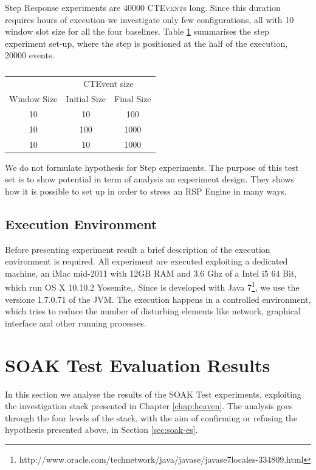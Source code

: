 Step Response experiments are 40000 \textsc{CTEvent}s long. Since this duration requires hours of execution we investigate only few configurations, all with 10 window slot size for all the four baselines. Table \ref{tab:steptests} summarises the step experiment set-up, where the step is positioned at the half of the execution, 20000 events.
\begin{table}[htb]
\centering
 \begin{tabular}{c|c|c}
	  	\hline
	  	&\multicolumn{2}{c}{CTEvent size}  \\
		Window Size & Initial Size & Final Size\\
		\hline
		\hline
		 10 & 10 & 100\\
		  10 & 100 & 1000\\
		 10 & 10 & 1000\\
		\hline 
 \end{tabular}
 \caption{}
\label{tab:steptests}
\end{table}

We do not formulate hypothesis for Step experiments. The purpose of this test set is to show \name potential in term of analysis an experiment design. They shows how it is possible to set up \name in order to stress an RSP Engine in many ways.

\subsection{Execution Environment}\label{sec:execution-environment}

Before presenting experiment result a brief description of the execution environment is required. All experiment are executed exploiting a dedicated machine, an iMac mid-2011 with 12GB RAM and 3.6 Ghz of a Intel i5 64 Bit, which run OS X 10.10.2 Yosemite,. Since \name is developed with Java 7\footnote{http://www.oracle.com/technetwork/java/javase/javase7locales-334809.html}, we use the versione 1.7.0.71 of the JVM.
The execution happens in a controlled environment, which tries to reduce the number of disturbing elements like network, graphical interface and other running processes.

\section{SOAK Test Evaluation Results}\label{sec:soakres}

In this section we analyse the results of the SOAK Test experiments, exploiting the investigation stack presented in Chapter \ref{chap:heaven}. The analysis goes through the four levels of the stack, with the aim of confirming or refusing the hypothesis presented above, in Section \ref{sec:soak-es}. 

